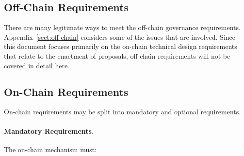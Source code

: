\subsection{Off-Chain Requirements}

There are many legitimate ways to meet the off-chain governance
requirements. Appendix~\ref{sect:off-chain} considers some of the issues that
are involved.  Since this document focuses primarily on the on-chain technical
design requirements that relate to the enactment of proposals, off-chain
requirements will not be covered in detail here.

\pagebreak
\subsection{On-Chain Requirements}

On-chain requirements may be split into mandatory and optional requirements.

\paragraph{Mandatory Requirements.}  The on-chain mechanism must:

